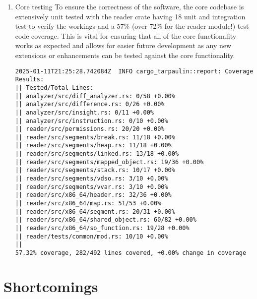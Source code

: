 \begin{enumerate}
    \item{Core testing}
    To ensure the correctness of the software, the core codebase is extensively unit tested with the reader crate having 18 unit and integration test to verify the workings and a 57\% (over 72\% for the reader module!) test code coverage. 
    This is vital for ensuring that all of the core functionality works as expected and allows for easier future development as any new extensions or enhancements can be tested against the core functionality.

    \begin{lstlisting}[caption="reader and analyzer joined coverage results"]
    2025-01-11T21:25:28.742084Z  INFO cargo_tarpaulin::report: Coverage Results:
|| Tested/Total Lines:
|| analyzer/src/diff_analyzer.rs: 0/58 +0.00%
|| analyzer/src/difference.rs: 0/26 +0.00%
|| analyzer/src/insight.rs: 0/11 +0.00%
|| analyzer/src/instruction.rs: 0/10 +0.00%
|| reader/src/permissions.rs: 20/20 +0.00%
|| reader/src/segments/break.rs: 11/18 +0.00%
|| reader/src/segments/heap.rs: 11/18 +0.00%
|| reader/src/segments/linked.rs: 13/18 +0.00%
|| reader/src/segments/mapped_object.rs: 19/36 +0.00%
|| reader/src/segments/stack.rs: 10/17 +0.00%
|| reader/src/segments/vdso.rs: 3/10 +0.00%
|| reader/src/segments/vvar.rs: 3/10 +0.00%
|| reader/src/x86_64/header.rs: 32/36 +0.00%
|| reader/src/x86_64/map.rs: 51/53 +0.00%
|| reader/src/x86_64/segment.rs: 20/31 +0.00%
|| reader/src/x86_64/shared_object.rs: 60/82 +0.00%
|| reader/src/x86_64/so_function.rs: 19/28 +0.00%
|| reader/tests/common/mod.rs: 10/10 +0.00%
||
57.32% coverage, 282/492 lines covered, +0.00% change in coverage
    \end{lstlisting}
    
\end{enumerate}

\section{Shortcomings}

